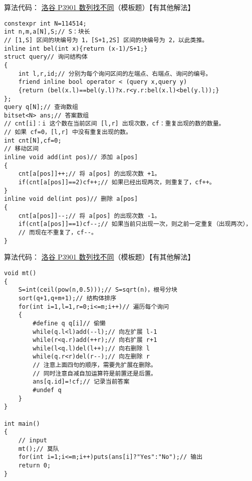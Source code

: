 \documentclass[table]{beamer}
\begin{document}
\begin{frame}[fragile]
	{算法代码：{\color{blue}
	\href{https://www.luogu.com.cn/problem/P3901}
	{洛谷 P3901 数列找不同}}（模板题）\footnotesize【有其他解法】}
	\tiny
	\begin{verbatim}
constexpr int N=114514;
int n,m,a[N],S;// S：块长
// [1,S] 区间的块编号为 1，[S+1,2S] 区间的块编号为 2，以此类推。
inline int bel(int x){return (x-1)/S+1;}
struct query// 询问结构体
{
    int l,r,id;// 分别为每个询问区间的左端点、右端点、询问的编号。
    friend inline bool operator < (query x,query y)
    {return (bel(x.l)==bel(y.l)?x.r<y.r:bel(x.l)<bel(y.l));}
};
query q[N];// 查询数组
bitset<N> ans;// 答案数组
// cnt[i]：i 这个数在当前区间 [l,r] 出现次数，cf：重复出现的数的数量。
// 如果 cf=0，[l,r] 中没有重复出现的数。
int cnt[N],cf=0;
// 移动区间
inline void add(int pos)// 添加 a[pos]
{
    cnt[a[pos]]++;// 将 a[pos] 的出现次数 +1。
    if(cnt[a[pos]]==2)cf++;// 如果已经出现两次，则重复了，cf++。
}
inline void del(int pos)// 删除 a[pos]
{
    cnt[a[pos]]--;// 将 a[pos] 的出现次数 -1。
    if(cnt[a[pos]]==1)cf--;// 如果当前只出现一次，则之前一定重复（出现两次），
    // 而现在不重复了，cf--。
}
\end{verbatim}
\end{frame}

\begin{frame}[fragile]
	{算法代码：{\color{blue}
	\href{https://www.luogu.com.cn/problem/P3901}
	{洛谷 P3901 数列找不同}}（模板题）\footnotesize【有其他解法】}
	\tiny
	\begin{verbatim}
void mt()
{
    S=int(ceil(pow(n,0.5)));// S=sqrt(n)，根号分块
    sort(q+1,q+m+1);// 结构体排序
    for(int i=1,l=1,r=0;i<=m;i++)// 遍历每个询问
    {
        #define q q[i]// 偷懒
        while(q.l<l)add(--l);// 向左扩展 l-1
        while(r<q.r)add(++r);// 向右扩展 r+1
        while(l<q.l)del(l++);// 向右删除 l
        while(q.r<r)del(r--);// 向左删除 r
        // 注意上面四句的顺序，需要先扩展在删除。
        // 同时注意自减自加运算符是前置还是后置。
        ans[q.id]=!cf;// 记录当前答案
        #undef q
    }
}

int main()
{
    // input
    mt();// 莫队
    for(int i=1;i<=m;i++)puts(ans[i]?"Yes":"No");// 输出
    return 0;
}
\end{verbatim}
\end{frame}
\end{document}
